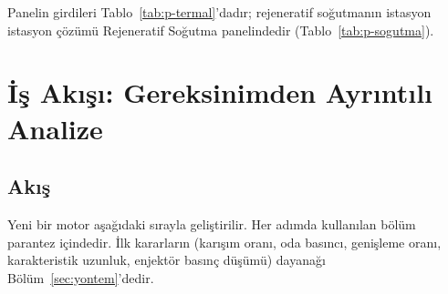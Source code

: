 \documentclass[11pt,a4paper]{article}
\newcommand{\ui}[1]{\textsf{#1}}
\begin{document}
Panelin girdileri Tablo~\ref{tab:p-termal}'dadır; rejeneratif soğutmanın
istasyon istasyon çözümü \ui{Rejeneratif Soğutma} panelindedir
(Tablo~\ref{tab:p-sogutma}).

\section{İş Akışı: Gereksinimden Ayrıntılı Analize}\label{sec:akis}

\subsection{Akış}

Yeni bir motor aşağıdaki sırayla geliştirilir. Her adımda kullanılan bölüm
parantez içindedir. İlk kararların (karışım oranı, oda basıncı, genişleme
oranı, karakteristik uzunluk, enjektör basınç düşümü) dayanağı
Bölüm~\ref{sec:yontem}'dedir.
\end{document}
